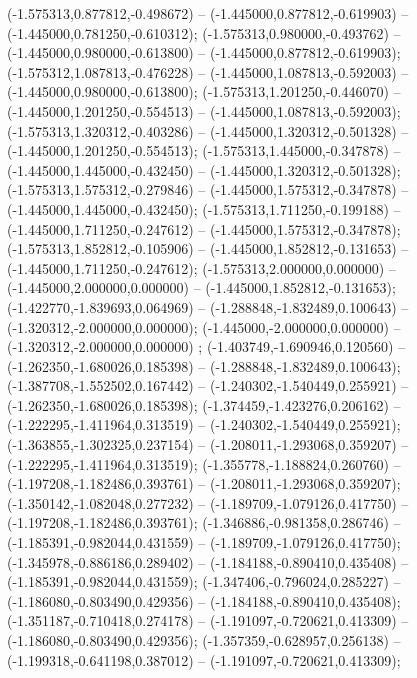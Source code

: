  (-1.575313,0.877812,-0.498672) -- (-1.445000,0.877812,-0.619903) -- (-1.445000,0.781250,-0.610312);
 (-1.575313,0.980000,-0.493762) -- (-1.445000,0.980000,-0.613800) -- (-1.445000,0.877812,-0.619903);
 (-1.575312,1.087813,-0.476228) -- (-1.445000,1.087813,-0.592003) -- (-1.445000,0.980000,-0.613800);
 (-1.575313,1.201250,-0.446070) -- (-1.445000,1.201250,-0.554513) -- (-1.445000,1.087813,-0.592003);
 (-1.575313,1.320312,-0.403286) -- (-1.445000,1.320312,-0.501328) -- (-1.445000,1.201250,-0.554513);
 (-1.575313,1.445000,-0.347878) -- (-1.445000,1.445000,-0.432450) -- (-1.445000,1.320312,-0.501328);
 (-1.575313,1.575312,-0.279846) -- (-1.445000,1.575312,-0.347878) -- (-1.445000,1.445000,-0.432450);
 (-1.575313,1.711250,-0.199188) -- (-1.445000,1.711250,-0.247612) -- (-1.445000,1.575312,-0.347878);
 (-1.575313,1.852812,-0.105906) -- (-1.445000,1.852812,-0.131653) -- (-1.445000,1.711250,-0.247612);
 (-1.575313,2.000000,0.000000) -- (-1.445000,2.000000,0.000000) -- (-1.445000,1.852812,-0.131653);
 (-1.422770,-1.839693,0.064969) -- (-1.288848,-1.832489,0.100643) -- (-1.320312,-2.000000,0.000000);
 (-1.445000,-2.000000,0.000000) -- (-1.320312,-2.000000,0.000000) ;
 (-1.403749,-1.690946,0.120560) -- (-1.262350,-1.680026,0.185398) -- (-1.288848,-1.832489,0.100643);
 (-1.387708,-1.552502,0.167442) -- (-1.240302,-1.540449,0.255921) -- (-1.262350,-1.680026,0.185398);
 (-1.374459,-1.423276,0.206162) -- (-1.222295,-1.411964,0.313519) -- (-1.240302,-1.540449,0.255921);
 (-1.363855,-1.302325,0.237154) -- (-1.208011,-1.293068,0.359207) -- (-1.222295,-1.411964,0.313519);
 (-1.355778,-1.188824,0.260760) -- (-1.197208,-1.182486,0.393761) -- (-1.208011,-1.293068,0.359207);
 (-1.350142,-1.082048,0.277232) -- (-1.189709,-1.079126,0.417750) -- (-1.197208,-1.182486,0.393761);
 (-1.346886,-0.981358,0.286746) -- (-1.185391,-0.982044,0.431559) -- (-1.189709,-1.079126,0.417750);
 (-1.345978,-0.886186,0.289402) -- (-1.184188,-0.890410,0.435408) -- (-1.185391,-0.982044,0.431559);
 (-1.347406,-0.796024,0.285227) -- (-1.186080,-0.803490,0.429356) -- (-1.184188,-0.890410,0.435408);
 (-1.351187,-0.710418,0.274178) -- (-1.191097,-0.720621,0.413309) -- (-1.186080,-0.803490,0.429356);
 (-1.357359,-0.628957,0.256138) -- (-1.199318,-0.641198,0.387012) -- (-1.191097,-0.720621,0.413309);
